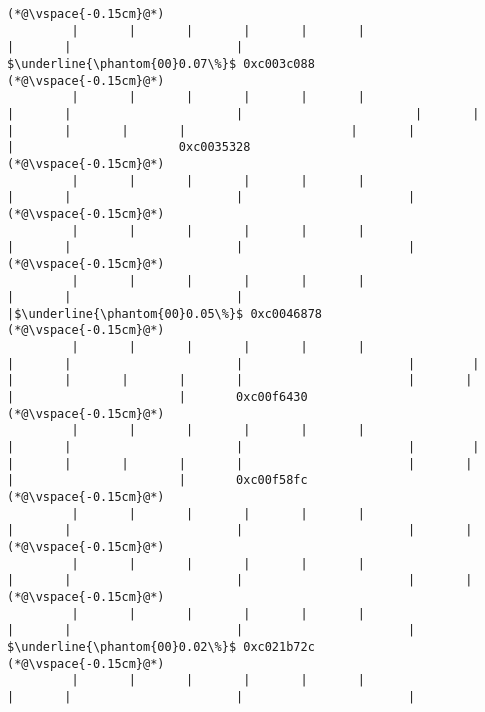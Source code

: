 \begin{lstlisting}[caption=NewDirectByteBuffer, label=profile:C2JNewDirectBuffer-512, numberbychapter=true, frame=lines, float, floatplacement=t]
(*@\vspace{-0.15cm}@*)
         |       |       |       |       |       |                       |       |                       |                $\underline{\phantom{00}0.07\%}$ 0xc003c088
(*@\vspace{-0.15cm}@*)
         |       |       |       |       |       |                       |       |                       |                        |       |       |       |       |       |                       |       |                       |                       0xc0035328
(*@\vspace{-0.15cm}@*)
         |       |       |       |       |       |                       |       |                       |                       |
(*@\vspace{-0.15cm}@*)
         |       |       |       |       |       |                       |       |                       |                       |
(*@\vspace{-0.15cm}@*)
         |       |       |       |       |       |                       |       |                       |                       |$\underline{\phantom{00}0.05\%}$ 0xc0046878
(*@\vspace{-0.15cm}@*)
         |       |       |       |       |       |                       |       |                       |                       |        |       |       |       |       |       |                       |       |                       |                       |       0xc00f6430
(*@\vspace{-0.15cm}@*)
         |       |       |       |       |       |                       |       |                       |                       |        |       |       |       |       |       |                       |       |                       |                       |       0xc00f58fc
(*@\vspace{-0.15cm}@*)
         |       |       |       |       |       |                       |       |                       |                       |       |
(*@\vspace{-0.15cm}@*)
         |       |       |       |       |       |                       |       |                       |                       |       |
(*@\vspace{-0.15cm}@*)
         |       |       |       |       |       |                       |       |                       |                       |        $\underline{\phantom{00}0.02\%}$ 0xc021b72c
(*@\vspace{-0.15cm}@*)
         |       |       |       |       |       |                       |       |                       |                       |

\end{lstlisting}
